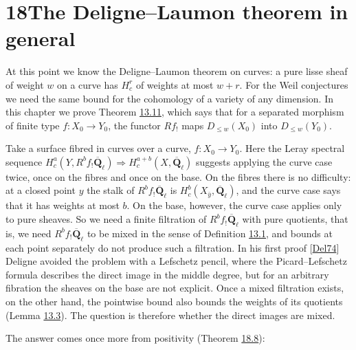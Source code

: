 \documentclass[11pt]{article}
\begin{document}
\section*{\texorpdfstring{18\quad The Deligne–Laumon theorem in general}{18 The Deligne–Laumon theorem in general}}
\label{bp271}%
\label{bp272}%
At this point we know the Deligne–Laumon theorem on curves: a pure lisse sheaf of weight \(w\) on a curve has \(H^r_c\) of weights at most \(w+r\). For the Weil conjectures we need the same bound for the cohomology of a variety of any dimension. In this chapter we prove Theorem \hyperref[bp38]{13.11}, which says that for a separated morphism of finite type \(f:X_0\to Y_0\), the functor \(Rf_!\) maps \(D_{\leq w}(X_0)\) into \(D_{\leq w}(Y_0)\).

Take a surface fibred in curves over a curve, \(f:X_0\to Y_0\). Here the Leray spectral sequence \(H^a_c(Y,R^bf_!\overline{\mathbf Q}_\ell)\Rightarrow H^{a+b}_c(X,\overline{\mathbf Q}_\ell)\) suggests applying the curve case twice, once on the fibres and once on the base. On the fibres there is no difficulty: at a closed point \(y\) the stalk of \(R^bf_!\overline{\mathbf Q}_\ell\) is \(H^b_c(X_{\bar y},\overline{\mathbf Q}_\ell)\), and the curve case says that it has weights at most \(b\). On the base, however, the curve case applies only to pure sheaves. So we need a finite filtration of \(R^bf_!\overline{\mathbf Q}_\ell\) with pure quotients, that is, we need \(R^bf_!\overline{\mathbf Q}_\ell\) to be mixed in the sense of Definition \hyperref[bp9]{13.1}, and bounds at each point separately do not produce such a filtration. In his first proof [\hyperref[bp350]{Del74}] Deligne avoided the problem with a Lefschetz pencil, where the Picard–Lefschetz formula describes the direct image in the middle degree, but for an arbitrary fibration the sheaves on the base are not explicit. Once a mixed filtration exists, on the other hand, the pointwise bound also bounds the weights of its quotients (Lemma \hyperref[bp14]{13.3}). The question is therefore whether the direct images are mixed.

The answer comes once more from positivity (Theorem \hyperref[bp295]{18.8}):
\end{document}
